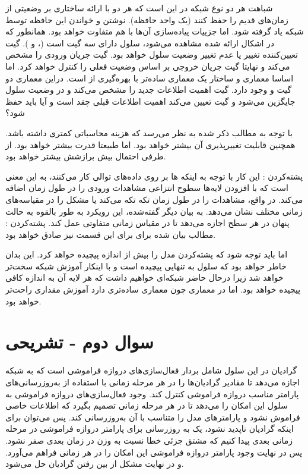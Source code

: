 \documentclass{article}
\begin{document}
\cleardoublepage

شباهت هر دو نوع شبکه در این است که هر دو با ارائه ساختاری بر   وضعیتی از زما‌ن‌های قدیم را حفظ کنند (یک واحد حافظه). نوشتن و خواندن این حافظه توسط شبکه یاد گرفته شود. اما جزییات پیاده‌سازی آن‌ها با هم متفاوت خواهد بود.  همانطور که در اشکال ارائه شده مشاهده می‌‌شود، سلول  دارای سه گیت است (،  و ). گیت   تعیین‌کننده تغییر یا عدم تغییر وضعیت سلول خواهد بود. گیت   جریان ورودی را مشخص می‌کند و نهایتا گیت  جریان خروجی بر اساس وضعیت فعلی را کنترل خواهد کرد. اما اساسا معماری و ساختار  یک معماری ساده‌تر با بهره‌گیری از  است. دراین معماری دو گیت   و  وجود دارد. گیت  اهمیت اطلاعات جدید را مشخص می‌کند و در وضعیت سلول جایگزین می‌شود و گیت    تعیین می‌کند اهمیت اطلاعات قبلی چقد است و آیا باید حفظ شود؟

با توجه به مطالب ذکر شده به نظر می‌رسد که  هزینه محاسباتی کمتری داشته باشد. همچنین قابلیت تغییرپذیری آن بیشتر خواهد بود. اما طبیعتا قدرت  بیشتر خواهد بود. از طرفی  احتمال بیش برازشش بیشتر خواهد بود.

پشته‌کردن : این کار با توجه به اینکه  ها بر روی داده‌های توالی کار می‌کنند، به این معنی است که با افزودن لایه‌ها سطوح انتزاعی مشاهدات ورودی را در طول زمان اضافه می‌کند. در واقع، مشاهدات را در طول زمان تکه تکه می‌کند یا مشکل را در مقیاسه‌های زمانی مختلف نشان می‌دهد. به بیان دیگر گفته‌شده، این رویکرد به طور بالقوه به حالت پنهان در هر سطح اجازه می‌دهد تا در مقیاس زمانی متفاوتی عمل کند.
پشته‌کردن : مطالب بیان شده برای  برای این قسمت نیز صادق خواهد بود. 

اما باید توجه شود که پشته‌کردن  مدل را بیش از اندازه پیچیده خواهد کرد. این بدان خاطر خواهد بود که سلول  به تنهایی پیچیده است و با اینکار آموزش شبکه سخت‌تر خواهد شد زیرا درحال حاضر شبکه‌ای خواهیم داشت که هر لایه آن به اندازه کافی پیچیده خواهد بود. اما در معماری  چون معماری ساده‌تری دارد آموزش مقداری راحت‌تر خواهد بود.




\section{سوال دوم - تشریحی}
گرادیان در این سلول شامل بردار فعال‌سازی‌های دروازه فراموشی است که به شبکه اجازه می‌دهد تا مقادیر گرادیان‌ها را در هر مرحله زمانی با استفاده از به‌روزرسانی‌های پارامتر مناسب دروازه فراموشی کنترل کند. وجود فعال‌سازی‌های دروازه فراموشی به سلول این امکان را می‌دهد تا در هر مرحله زمانی تصمیم بگیرد که اطلاعات خاصی فراموش نشود و پارامترهای مدل را متناسب با آن به‌روزرسانی کند. پس می‌توان برای اینکه گرادیان ناپدید نشود، یک به روزرسانی برای پارامتر دروازه فراموشی در مرحله زمانی  بعدی پیدا کنیم که مشتق جزئی خطا نسبت به وزن در زمان بعدی صفر نشود. پس در نهایت وجود پارامتر دروازه فراموشی این امکان را در هر زمانی فراهم می‌آورد. و در نهایت مشکل از بین رفتن گرادیان حل می‌شود.
\end{document}
